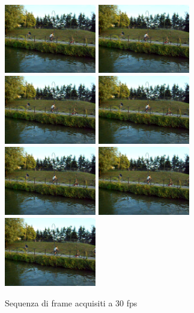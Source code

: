 \begin{figure}
	\includegraphics[width = 4cm]{./pictures/FPSalto/img0006}
	\includegraphics[width = 4cm]{./pictures/FPSalto/img0007}
	\includegraphics[width = 4cm]{./pictures/FPSalto/img0008}
	\includegraphics[width = 4cm]{./pictures/FPSalto/img0009}
	\includegraphics[width = 4cm]{./pictures/FPSalto/img0010}
	\includegraphics[width = 4cm]{./pictures/FPSalto/img0011}
	\includegraphics[width = 4cm]{./pictures/FPSalto/img0012}
	\caption{Sequenza di frame acquisiti a 30 fps}
	\label{fig:acquisizioneContinua}
\end{figure}
